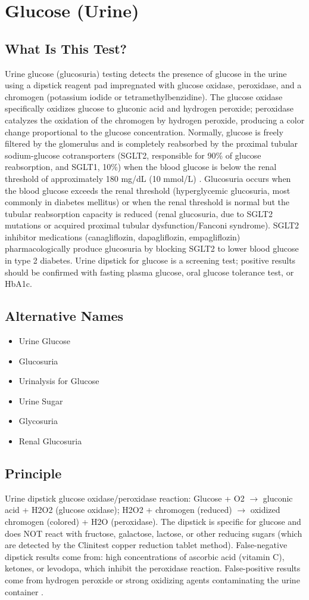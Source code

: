 \chapter{Glucose (Urine)}
\section*{What Is This Test?}
Urine glucose (glucosuria) testing detects the presence of glucose in the urine using a dipstick reagent pad impregnated with glucose oxidase, peroxidase, and a chromogen (potassium iodide or tetramethylbenzidine). The glucose oxidase specifically oxidizes glucose to gluconic acid and hydrogen peroxide; peroxidase catalyzes the oxidation of the chromogen by hydrogen peroxide, producing a color change proportional to the glucose concentration. Normally, glucose is freely filtered by the glomerulus and is completely reabsorbed by the proximal tubular sodium-glucose cotransporters (SGLT2, responsible for 90\% of glucose reabsorption, and SGLT1, 10\%) when the blood glucose is below the renal threshold of approximately 180 mg/dL (10 mmol/L) \cite{moe2020sodium}. Glucosuria occurs when the blood glucose exceeds the renal threshold (hyperglycemic glucosuria, most commonly in diabetes mellitus) or when the renal threshold is normal but the tubular reabsorption capacity is reduced (renal glucosuria, due to SGLT2 mutations or acquired proximal tubular dysfunction/Fanconi syndrome). SGLT2 inhibitor medications (canagliflozin, dapagliflozin, empagliflozin) pharmacologically produce glucosuria by blocking SGLT2 to lower blood glucose in type 2 diabetes. Urine dipstick for glucose is a screening test; positive results should be confirmed with fasting plasma glucose, oral glucose tolerance test, or HbA1c.
\section*{Alternative Names}
\begin{itemize}
  \item Urine Glucose
  \item Glucosuria
  \item Urinalysis for Glucose
  \item Urine Sugar
  \item Glycosuria
  \item Renal Glucosuria
\end{itemize}
\section*{Principle}
Urine dipstick glucose oxidase/peroxidase reaction: Glucose + O2 $\rightarrow$ gluconic acid + H2O2 (glucose oxidase); H2O2 + chromogen (reduced) $\rightarrow$ oxidized chromogen (colored) + H2O (peroxidase). The dipstick is specific for glucose and does NOT react with fructose, galactose, lactose, or other reducing sugars (which are detected by the Clinitest copper reduction tablet method). False-negative dipstick results come from: high concentrations of ascorbic acid (vitamin C), ketones, or levodopa, which inhibit the peroxidase reaction. False-positive results come from hydrogen peroxide or strong oxidizing agents contaminating the urine container \cite{rifai2018tietz}.
